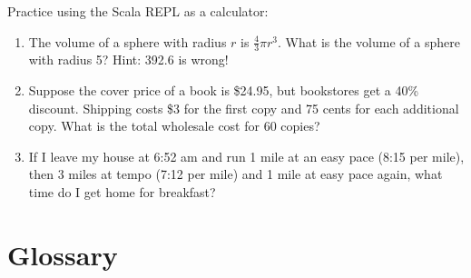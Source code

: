 \documentclass[10pt]{book}
\begin{document}
\begin{ex}
Practice using the Scala REPL as a calculator: 

\begin{enumerate}

\item The volume of a sphere with radius $r$ is $\frac{4}{3} \pi r^3$.
  What is the volume of a sphere with radius 5?  Hint: 392.6 is wrong!

\item Suppose the cover price of a book is \$24.95, but bookstores get a
  40\% discount.  Shipping costs \$3 for the first copy and 75 cents
  for each additional copy.  What is the total wholesale cost for
  60 copies?

\item If I leave my house at 6:52 am and run 1 mile at an easy pace
  (8:15 per mile), then 3 miles at tempo (7:12 per mile) and 1 mile at
  easy pace again, what time do I get home for breakfast?

\end{enumerate}
\end{ex}


\section{Glossary}
\end{document}
